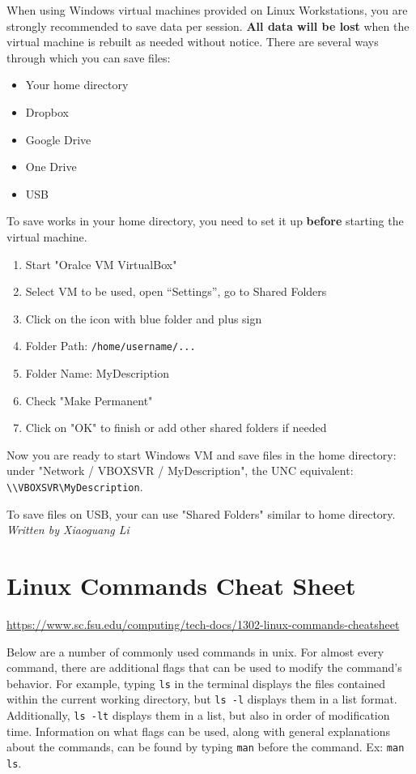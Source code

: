 \documentclass[12pt,a4paper]{article}
\begin{document}
When using Windows virtual machines provided on Linux Workstations, you are strongly recommended to save data per session.
\textbf{All data will be lost} when the virtual machine is rebuilt as needed without notice. There are several ways through which you can save files:
\begin{itemize}
    \item Your home directory
    \item Dropbox
    \item Google Drive
    \item One Drive
    \item USB
\end{itemize}
To save works in your home directory, you need to set it up \textbf{before} starting the virtual machine.
\begin{enumerate}
    \item Start "Oralce VM VirtualBox"
    \item Select VM to be used, open “Settings”, go to Shared Folders
    \item Click on the icon with blue folder and plus sign
    \item Folder Path: \texttt{/home/username/...}
    \item Folder Name: MyDescription
    \item Check "Make Permanent"
    \item Click on "OK" to finish or add other shared folders if needed
\end{enumerate}
Now you are ready to start Windows VM and save files in the home directory: under "Network / VBOXSVR / MyDescription", the UNC equivalent: \texttt{\textbackslash{}\textbackslash{}VBOXSVR\textbackslash{}MyDescription}.

To save files on USB, your can use "Shared Folders" similar to home directory.
\hfill \textit{Written by Xiaoguang Li}

\section{Linux Commands Cheat Sheet}
\url{https://www.sc.fsu.edu/computing/tech-docs/1302-linux-commands-cheatsheet}

Below are a number of commonly used commands in unix. For almost every command, there are additional flags that can be used to modify the command's behavior. For example, typing \texttt{ls} in the terminal displays the files contained within the current working directory, but \texttt{ls -l} displays them in a list format. Additionally, \texttt{ls -lt} displays them in a list, but also in order of modification time. Information on what flags can be used, along with general explanations about the commands, can be found by typing \texttt{man} before the command. Ex: \texttt{man ls}.
\end{document}

